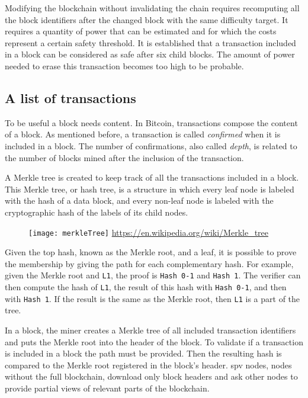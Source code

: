 Modifying the blockchain without invalidating the chain requires recomputing all
the block identifiers after the changed block with the same difficulty target. It requires a quantity of power
that can be estimated and for which the costs represent a certain safety
threshold. It is established that a transaction included in a block can be
considered as safe after six child blocks. The amount of power needed to erase
this transaction becomes too high to be probable.

\subsection{A list of transactions}

To be useful a block needs content. In Bitcoin, transactions compose the
content of a block. As mentioned before, a transaction is called
\textit{confirmed} when it is included in a block. The number of confirmations,
also called \textit{depth}, is related to the number of blocks mined after the
inclusion of the transaction.

A Merkle tree is created to keep track of all the transactions included in a
block. This Merkle tree, or hash tree, is a structure in which every leaf
node is labeled with the hash of a data block, and every non-leaf node is
labeled with the cryptographic hash of the labels of its child nodes.

\begin{figure}[H]
	\centering
	\texttt{[image: merkleTree]}
	{\url{https://en.wikipedia.org/wiki/Merkle_tree}}
	\label{fig:merkleTree}
\end{figure}

Given the top hash, known as the Merkle root, and a leaf, it is possible to prove the
membership by giving the path for each complementary hash. For example, given the
Merkle root and \texttt{L1}, the proof is \texttt{Hash 0-1} and \texttt{Hash 1}.
The verifier can then compute the hash of \texttt{L1}, the result of this hash
with \texttt{Hash 0-1}, and then with \texttt{Hash 1}. If the result is the same
as the Merkle root, then \texttt{L1} is a part of the tree.

In a block, the miner creates a Merkle tree of all included transaction
identifiers and puts the Merkle root into the header of the block. To validate
if a transaction is included in a block the path must be provided. Then the
resulting hash is compared to the Merkle root registered in the block's header.
\gls{spv} nodes, nodes without the full blockchain, download only block headers
and ask other nodes to provide partial views of relevant parts of the blockchain.

